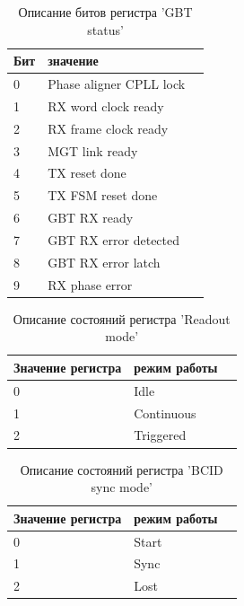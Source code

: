 \documentclass{article}
\begin{document}
\begin{table}[H]
\centering
\begin{tabular}{| l | l | l |}
\hline
Бит & значение \\ \hline
0 & Phase aligner CPLL lock \\ \hline
1 & RX word clock ready \\ \hline
2 & RX frame clock ready \\ \hline
3 & MGT link ready \\ \hline
4 & TX reset done \\ \hline
5 & TX FSM reset done \\ \hline
6 & GBT RX ready \\ \hline
7 & GBT RX error detected \\ \hline
8 & GBT RX error latch \\ \hline
9 & RX phase error \\ \hline
\end{tabular}
\caption{Описание битов регистра 'GBT status'\label{tab10}}
\end{table}




\begin{table}[H]
\centering
\begin{tabular}{| l | l | l |}
\hline
Значение регистра & режим работы \\ \hline
0 & Idle \\ \hline
1 & Continuous \\ \hline
2 & Triggered \\ \hline
\end{tabular}
\caption{Описание состояний регистра 'Readout mode'\label{tab11}}
\end{table}



\begin{table}[H]
\centering
\begin{tabular}{| l | l | l |}
\hline
Значение регистра & режим работы \\ \hline
0 & Start \\ \hline
1 & Sync \\ \hline
2 & Lost \\ \hline
\end{tabular}
\caption{Описание состояний регистра 'BCID sync mode'\label{tab12}}
\end{table}
\end{document}
